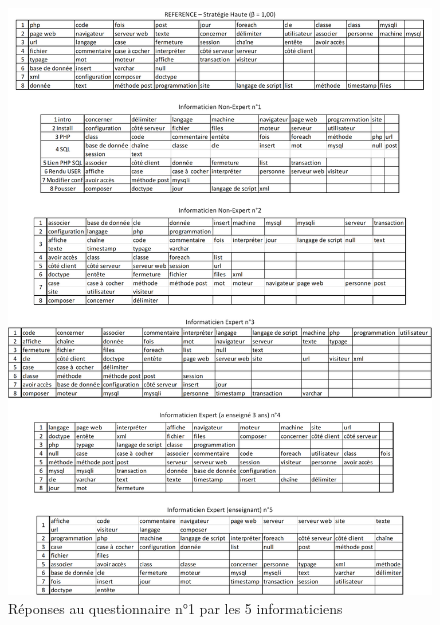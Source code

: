 \begin{figure}[htb!]
\centering
\centerline{  %
\includegraphics[scale=0.61]{4-Experiences/images/cas-5/questionnaire-1.png}
}
\caption{Réponses au questionnaire n°1 par les 5 informaticiens}
\label{figure:4-cas-5-Questionnaire-1-ClustersInformaticiens}
\end{figure}





\clearpage %
\newpage   %

